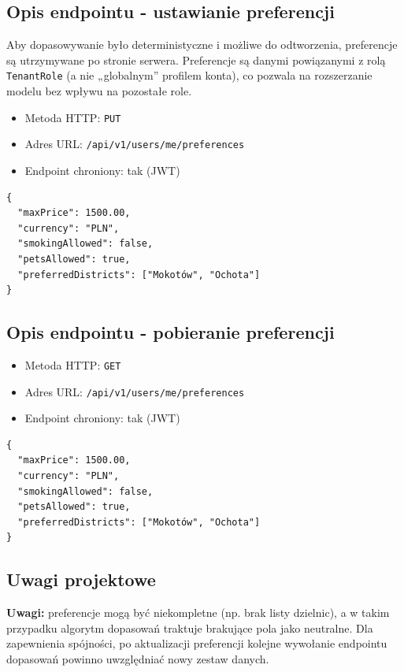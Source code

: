 \documentclass[11pt, a4paper]{article}
\begin{document}
\subsection{Opis endpointu - ustawianie preferencji}
Aby dopasowywanie było deterministyczne i możliwe do odtworzenia, preferencje są utrzymywane po stronie serwera.
Preferencje są danymi powiązanymi z rolą \texttt{TenantRole} (a nie „globalnym” profilem konta), co pozwala na rozszerzanie modelu
bez wpływu na pozostałe role.

\begin{itemize}
    \item Metoda HTTP: \texttt{PUT}
    \item Adres URL: \texttt{/api/v1/users/me/preferences}
    \item Endpoint chroniony: tak (JWT)
\end{itemize}

\begin{lstlisting}[style=json,caption={Ciało żądania — preferencje Lokatora}]
{
  "maxPrice": 1500.00,
  "currency": "PLN",
  "smokingAllowed": false,
  "petsAllowed": true,
  "preferredDistricts": ["Mokotów", "Ochota"]
}
\end{lstlisting}

\subsection{Opis endpointu - pobieranie preferencji}

\begin{itemize}
    \item Metoda HTTP: \texttt{GET}
    \item Adres URL: \texttt{/api/v1/users/me/preferences}
    \item Endpoint chroniony: tak (JWT)
\end{itemize}

\begin{lstlisting}[style=json,caption={Ciało odpowiedzi — sukces}]
{
  "maxPrice": 1500.00,
  "currency": "PLN",
  "smokingAllowed": false,
  "petsAllowed": true,
  "preferredDistricts": ["Mokotów", "Ochota"]
}
\end{lstlisting}

\subsection{Uwagi projektowe}

\noindent\textbf{Uwagi:} preferencje mogą być niekompletne (np. brak listy dzielnic), a w takim przypadku algorytm dopasowań traktuje brakujące pola jako neutralne.
Dla zapewnienia spójności, po aktualizacji preferencji kolejne wywołanie endpointu dopasowań powinno uwzględniać nowy zestaw danych.
\end{document}
